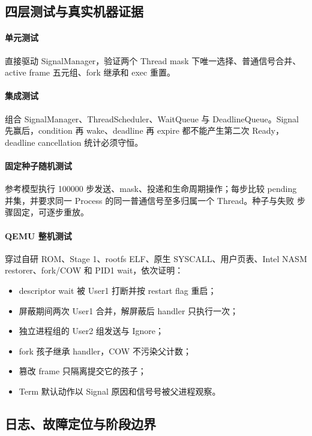 \subsection{四层测试与真实机器证据}

\paragraph{单元测试}
直接驱动 SignalManager，验证两个 Thread mask 下唯一选择、普通信号合并、
active frame 五元组、fork 继承和 exec 重置。

\paragraph{集成测试}
组合 SignalManager、ThreadScheduler、WaitQueue 与 DeadlineQueue。Signal
先赢后，condition 再 wake、deadline 再 expire 都不能产生第二次 Ready，
deadline cancellation 统计必须守恒。

\paragraph{固定种子随机测试}
参考模型执行 100000 步发送、mask、投递和生命周期操作；每步比较 pending
并集，并要求同一 Process 的同一普通信号至多归属一个 Thread。种子与失败
步骤固定，可逐步重放。

\paragraph{QEMU 整机测试}
 穿过自研 ROM、Stage 1、rootfs ELF、原生
SYSCALL、用户页表、Intel NASM restorer、fork/COW 和 PID1 wait，依次证明：

\begin{itemize}
  \item descriptor wait 被 User1 打断并按 restart flag 重启；
  \item 屏蔽期间两次 User1 合并，解屏蔽后 handler 只执行一次；
  \item 独立进程组的 User2 组发送与 Ignore；
  \item fork 孩子继承 handler，COW 不污染父计数；
  \item 篡改 frame 只隔离提交它的孩子；
  \item Term 默认动作以 Signal 原因和信号号被父进程观察。
\end{itemize}

\subsection{日志、故障定位与阶段边界}

